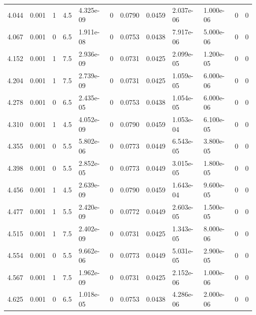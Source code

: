 \documentclass[preview]{standalone}
\begin{document}
{{\begin{tabular}{L{1.2cm}C{1.2cm} C{0.3cm}C{0.5cm} C{1.4cm}C{1.4cm} C{1.4cm}C{1.4cm} C{1.6cm}C{1.6cm} C{1.6cm}C{1.6cm}}
  4.044  &  0.001  & 1     & 4.5 &  4.325e-09  & 0  &  0.0790&   0.0459& 2.037e-06 & 1.000e-06   &  0 & 0  \\ 
  4.067  &  0.001  & 0     & 6.5 &  1.911e-08  & 0  &  0.0753&   0.0438& 7.917e-06 & 5.000e-06   &  0 & 0  \\ 
  4.152  &  0.001  & 1     & 7.5 &  2.936e-09  & 0  &  0.0731&   0.0425& 2.099e-05 & 1.200e-05   &  0 & 0  \\ 
  4.204  &  0.001  & 1     & 7.5 &  2.739e-09  & 0  &  0.0731&   0.0425& 1.059e-05 & 6.000e-06   &  0 & 0  \\ 
  4.278  &  0.001  & 0     & 6.5 &  2.435e-05  & 0  &  0.0753&   0.0438& 1.054e-05 & 6.000e-06   &  0 & 0  \\ 
  4.310  &  0.001  & 1     & 4.5 &  4.052e-09  & 0  &  0.0790&   0.0459& 1.053e-04 & 6.100e-05   &  0 & 0  \\ 
  4.355  &  0.001  & 0     & 5.5 &  5.802e-06  & 0  &  0.0773&   0.0449& 6.543e-05 & 3.800e-05   &  0 & 0  \\ 
  4.398  &  0.001  & 0     & 5.5 &  2.852e-05  & 0  &  0.0773&   0.0449& 3.015e-05 & 1.800e-05   &  0 & 0  \\ 
  4.456  &  0.001  & 1     & 4.5 &  2.639e-09  & 0  &  0.0790&   0.0459& 1.643e-04 & 9.600e-05   &  0 & 0  \\ 
  4.477  &  0.001  & 1     & 5.5 &  2.420e-09  & 0  &  0.0772&   0.0449& 2.603e-05 & 1.500e-05   &  0 & 0  \\ 
  4.515  &  0.001  & 1     & 7.5 &  2.402e-09  & 0  &  0.0731&   0.0425& 1.343e-05 & 8.000e-06   &  0 & 0  \\ 
  4.554  &  0.001  & 0     & 5.5 &  9.662e-06  & 0  &  0.0773&   0.0449& 5.031e-05 & 2.900e-05   &  0 & 0  \\ 
  4.567  &  0.001  & 1     & 7.5 &  1.962e-09  & 0  &  0.0731&   0.0425& 2.152e-06 & 1.000e-06   &  0 & 0  \\ 
  4.625  &  0.001  & 0     & 6.5 &  1.018e-05  & 0  &  0.0753&   0.0438& 4.286e-06 & 2.000e-06   &  0 & 0  \\ 
\hline 
\end{tabular} 

}}
\end{document}
